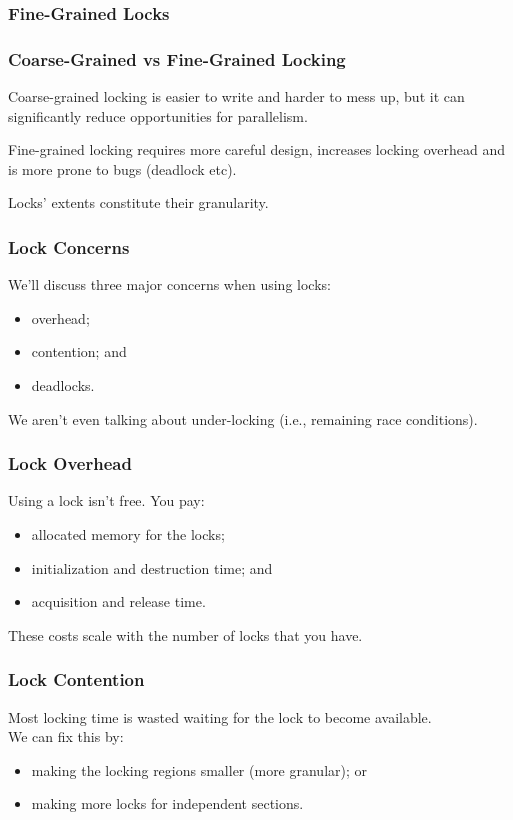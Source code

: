 \begin{frame}
\frametitle{Fine-Grained Locks}

  \begin{center}
    
  \end{center}

\end{frame}

\begin{frame}
\frametitle{Coarse-Grained vs Fine-Grained Locking}

\alert{Coarse-grained} locking is easier to write and harder to mess up, but it can significantly reduce opportunities for parallelism. 

\alert{Fine-grained locking} requires more careful design,
increases locking overhead and is more prone to bugs (deadlock etc).  


Locks' extents constitute their granularity. 

\end{frame}


\begin{frame}
\frametitle{Lock Concerns}

We'll discuss three major concerns when using locks:
  \begin{itemize}
    \item overhead;
    \item contention; and
    \item deadlocks.
  \end{itemize}
  
  
We aren't even talking about under-locking (i.e., remaining race conditions).

\end{frame}

\begin{frame}
\frametitle{Lock Overhead}

  Using a lock isn't free. You pay:
  \begin{itemize}
    \item allocated memory for the locks;
    \item initialization and destruction time; and
    \item acquisition and release time.
  \end{itemize}


  These costs scale with the number of locks that you have.
\end{frame}


\begin{frame}
\frametitle{Lock Contention}

\vspace*{-3em}
 Most locking time is wasted waiting for the lock to become available.\\[1em]
We can fix this by:
\vspace*{-3em}
      \begin{itemize}
        \item making the locking regions smaller (more granular); or
        \item making more locks for independent sections.
      \end{itemize}


\end{frame}

